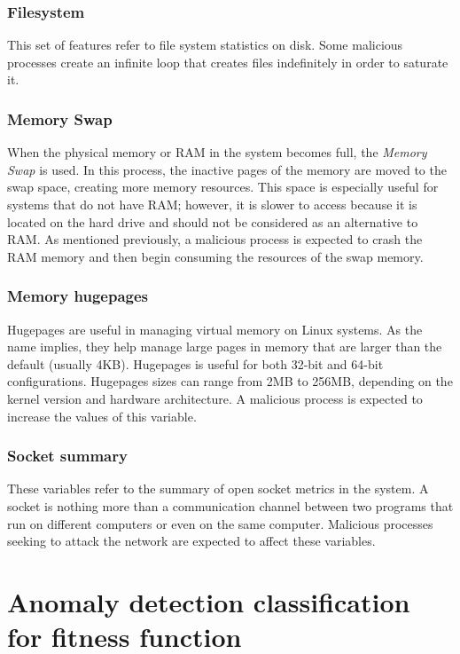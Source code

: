 \documentclass{iosart2c}
\begin{document}
\subsubsection{Filesystem}

This set of features refer to file system statistics on disk. Some malicious processes create an infinite loop that creates files indefinitely in order to saturate it.

\subsubsection{Memory Swap}

When the physical memory or RAM in the system becomes full, the \textit{Memory Swap} is used. In this process, the inactive pages of the memory are moved to the swap space, creating more memory resources. This space is especially useful for systems that do not have RAM; however, it is slower to access because it is located on the hard drive and should not be considered as an alternative to RAM. As mentioned previously, a malicious process is expected to crash the RAM memory and then begin consuming the resources of the swap memory.


\subsubsection{Memory hugepages}

Hugepages are useful in managing virtual memory on Linux systems. As the name implies, they help manage large pages in memory that are larger than the default (usually 4KB). Hugepages is useful for both 32-bit and 64-bit configurations. Hugepages sizes can range from 2MB to 256MB, depending on the kernel version and hardware architecture. A malicious process is expected to increase the values of this variable.


\subsubsection{Socket summary}
These variables refer to the summary of open socket metrics in the system. A socket is nothing more than a communication channel between two programs that run on different computers or even on the same computer. Malicious processes seeking to attack the network are expected to affect these variables.

\section{Anomaly detection classification for fitness function}\label{autoencoder_section}
\end{document}
